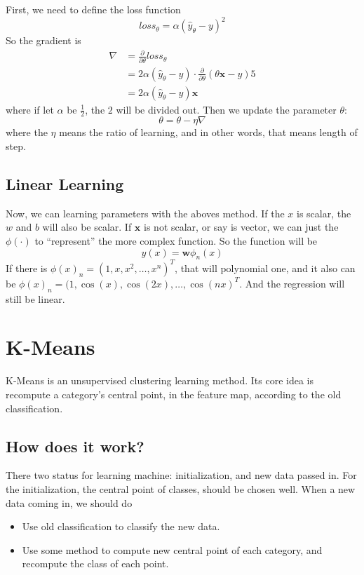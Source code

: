 \documentclass{article}
\begin{document}
First, we need  to define the loss function
\[
loss_\theta = \alpha(\hat{y}_\theta - y)^2
\]
So the gradient is
\begin{align*}
\nabla &= \frac{\partial}{\partial \theta}loss_\theta \\
       &= 2\alpha (\hat{y}_\theta -y)\cdot \frac{\partial}{\partial \theta}\left(\theta \mathbf{x} - y\right) 5 \\
       &= 2\alpha(\hat{y}_\theta -y)\mathbf{x}
\end{align*}
where if let $\alpha$ be $\frac{1}{2}$, the $2$ will be divided out.
Then we update the parameter $\theta$:
\[
\theta = \theta - \eta\nabla
\]
where the $\eta$ means the ratio of learning, and in other words, that means length of step.

\subsection{Linear Learning}
\label{sec:lreg:how}

Now, we can learning parameters with the aboves method.
If the $x$ is scalar, the $w$ and $b$ will also be scalar. If $\mathbf{x}$ is not scalar, or say is vector,
we can just the $\phi(\cdot)$ to ``represent'' the more complex function.
So the function will be 
\[
y(x) = \mathbf{w}\phi_n(x)
\]
If there is $\phi(x)_n = (1,x,x^2,\dots,x^n)^T$, that will polynomial one, and it also can be $\phi(x)_n = (1,\cos(x),\cos(2x),\dots,\cos(nx)^T$.
And the regression will still be linear.

\section{K-Means}
\label{sec:kmeans}

K-Means is an unsupervised clustering learning method. Its core idea is recompute a category's central point, in the feature map,  according
to the old classification.

\subsection{How does it work?}
\label{sec:kmeans:how}

There two status for learning machine: initialization, and new data passed in.
For the initialization, the central point of classes, should be chosen well.
When a new data coming in, we should do
\begin{itemize}
	\item Use old classification to classify the new data.
	\item Use some method to compute new central point of each category, and recompute the class of each point.
\end{itemize}
\end{document}
